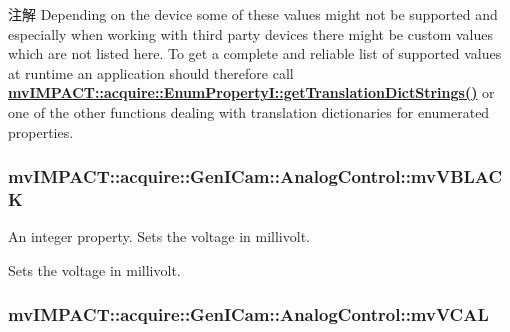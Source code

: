 \begin{DoxyNote}{注解}
Depending on the device some of these values might not be supported and especially when working with third party devices there might be custom values which are not listed here. To get a complete and reliable list of supported values at runtime an application should therefore call {\bfseries \hyperlink{classmv_i_m_p_a_c_t_1_1acquire_1_1_enum_property_i_a0ba6ccbf5ee69784d5d0b537924d26b6}{mv\+I\+M\+P\+A\+C\+T\+::acquire\+::\+Enum\+Property\+I\+::get\+Translation\+Dict\+Strings()}} or one of the other functions dealing with translation dictionaries for enumerated properties. 
\end{DoxyNote}
\hypertarget{classmv_i_m_p_a_c_t_1_1acquire_1_1_gen_i_cam_1_1_analog_control_aeeae0380fafa45bbd7d62146f0cec7d4}{
\subsubsection[{mv\+V\+B\+L\+A\+C\+K}]{ mv\+I\+M\+P\+A\+C\+T\+::acquire\+::\+Gen\+I\+Cam\+::\+Analog\+Control\+::mv\+V\+B\+L\+A\+C\+K}}\label{classmv_i_m_p_a_c_t_1_1acquire_1_1_gen_i_cam_1_1_analog_control_aeeae0380fafa45bbd7d62146f0cec7d4}


An integer property. Sets the voltage in millivolt. 

Sets the voltage in millivolt. \hypertarget{classmv_i_m_p_a_c_t_1_1acquire_1_1_gen_i_cam_1_1_analog_control_ab5cb092b98c165d578c4ba2f718a7d81}{
\subsubsection[{mv\+V\+C\+A\+L}]{ mv\+I\+M\+P\+A\+C\+T\+::acquire\+::\+Gen\+I\+Cam\+::\+Analog\+Control\+::mv\+V\+C\+A\+L}}\label{classmv_i_m_p_a_c_t_1_1acquire_1_1_gen_i_cam_1_1_analog_control_ab5cb092b98c165d578c4ba2f718a7d81}


